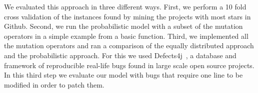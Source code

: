 \documentclass[conference]{IEEEtran}
\newcommand{\todo}[1]
  {{\scriptsize \textbf{\color{red} {#1}}}}
\begin{document}
We evaluated this approach in three different ways. First, we perform a 10 fold 
cross validation of the instances found by mining the projects with most stars 
in Github. Second, we run the probabilistic model with a subset of the mutation 
operators in a simple example from a basic function. Third, we implemented all 
the mutation operators and ran a comparison of the equally distributed approach 
and the probabilistic approach. For this we used Defects4j~\cite{just14}, a 
database and framework of reproducible real-life bugs found in large scale open 
source projects. In this third step we evaluate our model with bugs that require 
one line to be modified in order to patch them.





%
%

\end{document}
